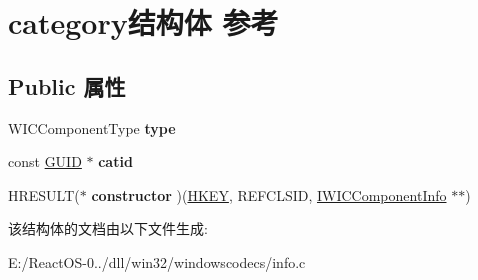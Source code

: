 \hypertarget{structcategory}{}\section{category结构体 参考}
\label{structcategory}
\subsection*{Public 属性}
\begin{DoxyCompactItemize}
\item 
\mbox{\label{structcategory_a14a871884d02b1a5cf95756dbd0d2f5f}} 
W\+I\+C\+Component\+Type {\bfseries type}
\item 
\mbox{\label{structcategory_a436c9b389af4b9a2a0a271e9cea2dba3}} 
const \hyperlink{interface_g_u_i_d}{G\+U\+ID} $\ast$ {\bfseries catid}
\item 
\mbox{\label{structcategory_a4be45d9634518ec22ac35689151324cf}} 
H\+R\+E\+S\+U\+LT($\ast$ {\bfseries constructor} )(\hyperlink{interfacevoid}{H\+K\+EY}, R\+E\+F\+C\+L\+S\+ID, \hyperlink{interface_i_w_i_c_component_info}{I\+W\+I\+C\+Component\+Info} $\ast$$\ast$)
\end{DoxyCompactItemize}


该结构体的文档由以下文件生成\+:\begin{DoxyCompactItemize}
\item 
E\+:/\+React\+O\+S-\/0../dll/win32/windowscodecs/info.\+c\end{DoxyCompactItemize}
